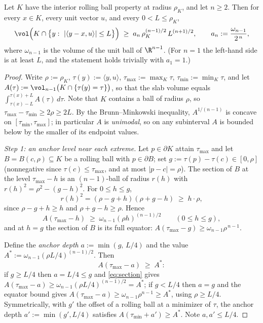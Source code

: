 \begin{lemma}\label{lem:rolling}
Let $K$ have the interior rolling ball property at radius $\rho_K$, and let
$n\ge2$.  Then for every $x\in K$, every unit vector $u$, and every
$0<L\le\rho_K$,
\[
\vol\Bigl(K\cap\bigl\{y:\ |\langle y-x,u\rangle|\le L\bigr\}\Bigr)
\;\ge\;
a_n\,\rho_K^{(n-1)/2}\,L^{(n+1)/2},
\qquad
a_n:=\frac{\omega_{n-1}}{2^{\,n}},
\]
where $\omega_{n-1}$ is the volume of the unit ball of $\R^{n-1}$.  (For $n=1$
the left-hand side is at least $L$, and the statement holds trivially with
$a_1=1$.)
\end{lemma}

\begin{proof}
Write $\rho:=\rho_K$, $\tau(y):=\langle y,u\rangle$,
$\tau_{\max}:=\max_K\tau$, $\tau_{\min}:=\min_K\tau$, and let
$A(\tau):=\vol_{n-1}\bigl(K\cap\{\tau(y)=\tau\}\bigr)$, so that the slab volume
equals $\int_{\tau(x)-L}^{\tau(x)+L}A(\tau)\,d\tau$.  Note that $K$ contains a
ball of radius $\rho$, so $\tau_{\max}-\tau_{\min}\ge2\rho\ge2L$.  By the
Brunn--Minkowski inequality, $A^{1/(n-1)}$ is concave on
$[\tau_{\min},\tau_{\max}]$; in particular $A$ is \emph{unimodal}, so on any
subinterval $A$ is bounded below by the smaller of its endpoint values.

\emph{Step 1: an anchor level near each extreme.}  Let $p\in\partial K$ attain
$\tau_{\max}$ and let $B=B(c,\rho)\subseteq K$ be a rolling ball with
$p\in\partial B$; set $g:=\tau(p)-\tau(c)\in[0,\rho]$ (nonnegative since
$\tau(c)\le\tau_{\max}$, and at most $|p-c|=\rho$).  The section of $B$ at the
level $\tau_{\max}-h$ is an $(n-1)$-ball of radius $r(h)$ with
$r(h)^2=\rho^2-(g-h)^2$.  For $0\le h\le g$,
\[
r(h)^2=(\rho-g+h)(\rho+g-h)\;\ge\;h\cdot\rho,
\]
since $\rho-g+h\ge h$ and $\rho+g-h\ge\rho$.  Hence
\begin{equation}\label{eq:section}
A(\tau_{\max}-h)\;\ge\;\omega_{n-1}(\rho h)^{(n-1)/2}
\qquad(0\le h\le g),
\end{equation}
and at $h=g$ the section of $B$ is its full equator:
$A(\tau_{\max}-g)\ge\omega_{n-1}\rho^{\,n-1}$.

Define the \emph{anchor depth} $a:=\min(g,\,L/4)$ and the value
$A^*:=\omega_{n-1}(\rho L/4)^{(n-1)/2}$.  Then
\begin{equation}\label{eq:anchor}
A(\tau_{\max}-a)\;\ge\;A^* :
\end{equation}
if $g\ge L/4$ then $a=L/4\le g$ and \eqref{eq:section} gives
$A(\tau_{\max}-a)\ge\omega_{n-1}(\rho L/4)^{(n-1)/2}=A^*$; if $g<L/4$ then
$a=g$ and the equator bound gives
$A(\tau_{\max}-a)\ge\omega_{n-1}\rho^{n-1}\ge A^*$, using $\rho\ge L/4$.
Symmetrically, with $g'$ the offset of a rolling ball at a minimizer of
$\tau$, the anchor depth $a':=\min(g',L/4)$ satisfies
$A(\tau_{\min}+a')\ge A^*$.  Note $a,a'\le L/4$.


\end{proof}
